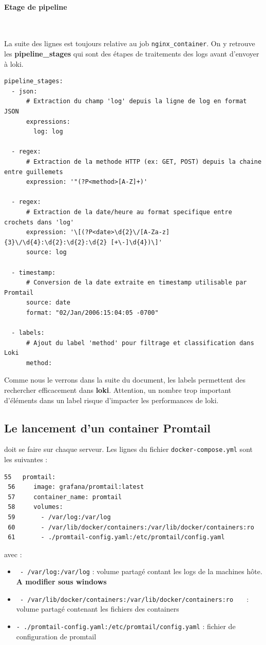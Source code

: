 \documentclass[french, 12pt]{article}%
\newcommand{\itemE}{\item[$\bullet$]}
\begin{document}
\paragraph{Etage de pipeline}\ 

La suite des lignes est toujours relative au job \verb?nginx_container?. On y retrouve les \textbf{pipeline\_stages} qui sont des étapes de traitements des logs avant d'envoyer à loki. 


\begin{lstlisting}[style=commande]
    pipeline_stages:
  - json:
      # Extraction du champ 'log' depuis la ligne de log en format JSON
      expressions:
        log: log

  - regex:
      # Extraction de la methode HTTP (ex: GET, POST) depuis la chaine entre guillemets
      expression: '"(?P<method>[A-Z]+)'

  - regex:
      # Extraction de la date/heure au format specifique entre crochets dans 'log'
      expression: '\[(?P<date>\d{2}\/[A-Za-z]{3}\/\d{4}:\d{2}:\d{2}:\d{2} [+\-]\d{4})\]'
      source: log

  - timestamp:
      # Conversion de la date extraite en timestamp utilisable par Promtail
      source: date
      format: "02/Jan/2006:15:04:05 -0700"

  - labels:
      # Ajout du label 'method' pour filtrage et classification dans Loki
      method:
\end{lstlisting}


Comme nous le verrons dans la suite du document, les labels permettent des rechercher efficacement dans \textbf{loki}. Attention, un nombre trop important d'éléments dans un label risque d'impacter les performances de loki. 



\subsection{Le lancement d'un container Promtail}
 doit se faire sur chaque serveur. Les lignes du fichier \verb?docker-compose.yml? sont les suivantes : 

\begin{lstlisting}[style=commande]
 55   promtail:
 56     image: grafana/promtail:latest
 57     container_name: promtail
 58     volumes:
 59       - /var/log:/var/log
 60       - /var/lib/docker/containers:/var/lib/docker/containers:ro        
 61       - ./promtail-config.yaml:/etc/promtail/config.yaml
\end{lstlisting}
avec : 
\begin{itemize}
\itemE \verb? - /var/log:/var/log? : volume partagé contant les logs de la machines hôte. \textbf{A modifier sous windows}
\itemE \verb? - /var/lib/docker/containers:/var/lib/docker/containers:ro   ? : volume partagé contenant les fichiers des containers
\itemE \verb?- ./promtail-config.yaml:/etc/promtail/config.yaml?  : fichier de configuration de promtail
\end{itemize}
\end{document}
